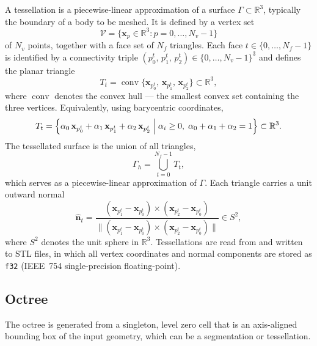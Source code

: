\documentclass[review,12pt]{elsarticle}
\begin{document}
A tessellation is a piecewise-linear approximation of a surface
$\Gamma \subset \mathbb{R}^3$, typically the boundary of a body to be meshed.
It is defined by a vertex set
\begin{equation}
  \mathcal{V} = \bigl\{\mathbf{x}_p \in \mathbb{R}^3 : p = 0,\ldots,N_v - 1\bigr\}
\end{equation}
of $N_v$ points, together with a face set of $N_f$ triangles.  Each face
$t \in \{0,\ldots,N_f-1\}$ is identified by a connectivity triple
$(p_0^t,\, p_1^t,\, p_2^t) \in \{0,\ldots,N_v-1\}^3$ and defines the
planar triangle
\begin{equation}
  T_t = \operatorname{conv}\bigl\{
    \mathbf{x}_{p_0^t},\, \mathbf{x}_{p_1^t},\, \mathbf{x}_{p_2^t}
  \bigr\} \subset \mathbb{R}^3,
\end{equation}
where $\operatorname{conv}$ denotes the convex hull --- the smallest convex
set containing the three vertices.  Equivalently, using barycentric
coordinates,
\begin{equation}
  T_t = \Bigl\{
    \alpha_0\,\mathbf{x}_{p_0^t}
    + \alpha_1\,\mathbf{x}_{p_1^t}
    + \alpha_2\,\mathbf{x}_{p_2^t}
    \;\Big|\;
    \alpha_i \geq 0,\; \alpha_0 + \alpha_1 + \alpha_2 = 1
  \Bigr\} \subset \mathbb{R}^3.
\end{equation}
The tessellated surface is the union of all triangles,
\begin{equation}
  \Gamma_h = \bigcup_{t=0}^{N_f-1} T_t,
\end{equation}
which serves as a piecewise-linear approximation of $\Gamma$.
Each triangle carries a unit outward normal
\begin{equation}
  \hat{\mathbf{n}}_t =
    \frac{
      (\mathbf{x}_{p_1^t} - \mathbf{x}_{p_0^t})
      \times
      (\mathbf{x}_{p_2^t} - \mathbf{x}_{p_0^t})
    }{
      \bigl\|
        (\mathbf{x}_{p_1^t} - \mathbf{x}_{p_0^t})
        \times
        (\mathbf{x}_{p_2^t} - \mathbf{x}_{p_0^t})
      \bigr\|
    } \in S^2,
\end{equation}
where $S^2$ denotes the unit sphere in $\mathbb{R}^3$.
Tessellations are read from and written to STL files, in which all
vertex coordinates and normal components are stored as \lstinline!f32!
(IEEE~754 single-precision floating-point).

\subsection{Octree}

The octree is generated from a singleton, level zero cell that is an axis-aligned bounding box of the input geometry, which can be a segmentation or tessellation.
\end{document}
